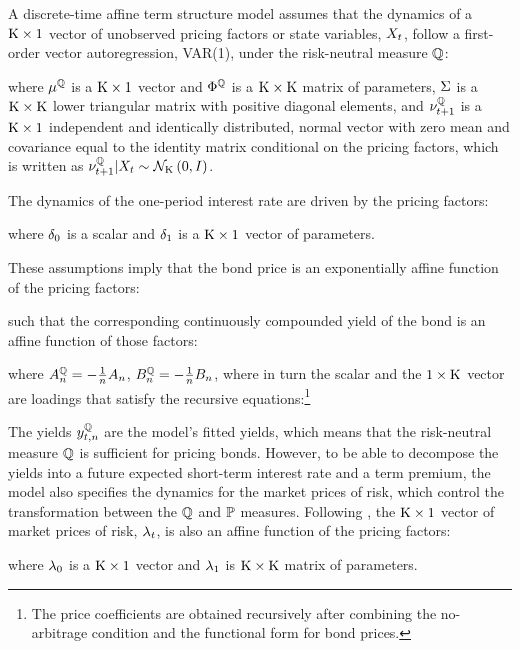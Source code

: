 {A discrete-time affine term structure model assumes that the dynamics of a \(\mathrm{K} \times 1\) vector of unobserved pricing factors or state variables, \(X_{t}\), follow a first-order vector autoregression, VAR(1), under the risk-neutral measure \(\mathbb{Q}\):
	
\noindent where \(\mu^{\mathbb{Q}}\) is a \(\mathrm{K} \times 1\) vector and \(\Phi^{\mathbb{Q}}\) is a \(\mathrm{K} \times \mathrm{K}\) matrix of parameters, \(\Sigma\) is a \(\mathrm{K} \times \mathrm{K}\) lower triangular matrix with positive diagonal elements, and \(\nu_{t+1}^{\mathbb{Q}}\) is a \(\mathrm{K} \times 1\) independent and identically distributed, normal vector with zero mean and covariance equal to the identity matrix conditional on the pricing factors, which is written as \(\nu_{t+1}^{\mathbb{Q}} | X_{t} \sim \mathcal{N}_{\mathrm{K}} \left(0,I\right)\). 

The dynamics of the one-period interest rate are driven by the pricing factors: 
	
\noindent where \(\delta_{0}\) is a scalar and \(\delta_{1}\) is a \(\mathrm{K} \times 1\) vector of parameters.

These assumptions imply that the bond price is an exponentially affine function of the pricing factors:
	
\noindent such that the corresponding continuously compounded yield of the bond is an affine function of those factors:
	
\noindent where \(A_{n}^{\mathbb{Q}} = - \frac{1}{n} A_{n}\), \(B_{n}^{\mathbb{Q}} = - \frac{1}{n} B_{n}\), where in turn the scalar  and the \(1 \times \mathrm{K}\) vector  are loadings that satisfy the recursive equations:\footnote{ The price coefficients are obtained recursively after combining the no-arbitrage condition and the functional form for bond prices.}
	
	\vspace{-.7cm}
	
The yields \(y_{t,n}^{\mathbb{Q}}\) are the model's fitted yields, which means that the risk-neutral measure \(\mathbb{Q}\) is sufficient for pricing bonds. 
However, to be able to decompose the yields into a future expected short-term interest rate and a term premium, the model also specifies the dynamics for the market prices of risk, which control the transformation between the \(\mathbb{Q}\) and \(\mathbb{P}\) measures. 
Following \cite{Duffee:2002}, the \(\mathrm{K} \times 1\) vector of market prices of risk, \(\lambda_{t}\), is also an affine function of the pricing factors:
	
\noindent where \(\lambda_{0}\) is a \(\mathrm{K} \times 1\) vector and \(\lambda_{1}\) is \(\mathrm{K} \times \mathrm{K}\) matrix of parameters.

}

